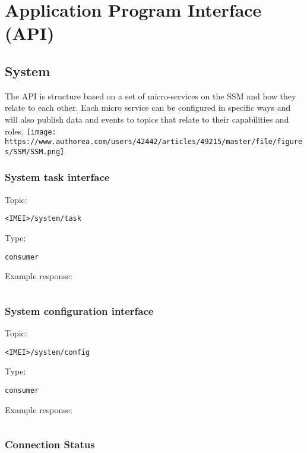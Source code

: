 \section{Application Program Interface (API)}
\subsection{System}
The API is structure based on a set of micro-services on the SSM and how they relate to each other. Each micro service can be configured in specific ways and will also publish data and events to topics that relate to their capabilities and roles.
\texttt{[image: https://www.authorea.com/users/42442/articles/49215/master/file/figures/SSM/SSM.png]}

\subsubsection{System task interface}

Topic:
\begin{lstlisting}<IMEI>/system/task\end{lstlisting}
Type:
\begin{lstlisting}consumer\end{lstlisting}
Example response:
\begin{lstlisting}\end{lstlisting}

\subsubsection{System configuration interface}

Topic:
\begin{lstlisting}<IMEI>/system/config\end{lstlisting}
Type:
\begin{lstlisting}consumer\end{lstlisting}
Example response:
\begin{lstlisting}\end{lstlisting}

\subsubsection{Connection Status}

